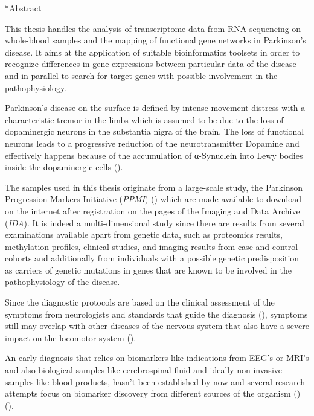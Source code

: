\documentclass[12pt]{report}
\makeatletter
\let\oldchapter\chapter
\renewcommand{\chapter}{\@ifstar{\starchapter}{\nostarchapter}}
\newcommand{\starchapter}[1]{\oldchapter*{#1}\thispagestyle{mainstyle}}
\newcommand{\nostarchapter}[1]{\oldchapter{#1}\thispagestyle{mainstyle}}
\makeatother
\begin{document}
    \chapter*{Abstract}
            \par
                This thesis handles the analysis of transcriptome data from RNA sequencing on whole-blood samples and the mapping of functional gene networks in Parkinson's disease. It aims at the application of suitable bioinformatics toolsets in order to recognize differences in gene expressions between particular data of the disease and in parallel to search for target genes with possible involvement in the pathophysiology.
            \par
                Parkinson's disease on the surface is defined by intense movement distress with a characteristic tremor in the limbs which is assumed to be due to the loss of dopaminergic neurons in the substantia nigra of the brain. The loss of functional neurons leads to a progressive reduction of the neurotransmitter Dopamine and effectively happens because of the accumulation of α-Synuclein into Lewy bodies inside the dopaminergic cells (\emph{\cite{Balestrino2020ParkinsonDisease}}).
            \par
                The samples used in this thesis originate from a large-scale study, the Parkinson Progression Markers Initiative (\emph{PPMI}) (\emph{\cite{Marek2011ThePPMI}}) which are made available to download on the internet after registration on the pages of the Imaging and Data Archive (\emph{IDA}). It is indeed a multi-dimensional study since there are results from several examinations available apart from genetic data, such as proteomics results, methylation profiles, clinical studies, and imaging results from case and control cohorts and additionally from individuals with a possible genetic predisposition as carriers of genetic mutations in genes that are known to be involved in the pathophysiology of the disease.
            \par
                Since the diagnostic protocols are based on the clinical assessment of the symptoms from neurologists and standards that guide the diagnosis (\emph{\cite{Koller2018TableGuidelines}}), symptoms still may overlap with other diseases of the nervous system that also have a severe impact on the locomotor system (\emph{\cite{Tolosa2021ChallengesDisease}}).
            \par
                An early diagnosis that relies on biomarkers like indications from EEG's or MRI's and also biological samples like cerebrospinal fluid and ideally non-invasive samples like blood products, hasn't been established by now and several research attempts focus on biomarker discovery from different sources of the organism (\emph{\cite{Miller2015BiomarkersFuture}}) (\emph{\cite{Maitin2022SurveyReview}}).
\end{document}
